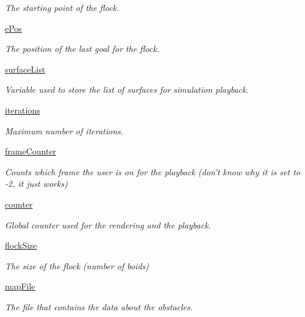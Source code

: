 \begin{DoxyCompactItemize}
\begin{DoxyCompactList}\small\item\em The starting point of the flock. \end{DoxyCompactList}\item 
\hyperlink{classboidsimulation_1_1FlockSim_acb064f74364917a97ca9d3accdf96f45}{e\-Pos}
\begin{DoxyCompactList}\small\item\em The position of the last goal for the flock. \end{DoxyCompactList}\item 
\hyperlink{classboidsimulation_1_1FlockSim_a60f47dc6f8186030cd22f3ca3b37c4e6}{surface\-List}
\begin{DoxyCompactList}\small\item\em Variable used to store the list of surfaces for simulation playback. \end{DoxyCompactList}\item 
\hyperlink{classboidsimulation_1_1FlockSim_a1febd4cacbdcffb5b9d096d4716af78f}{iterations}
\begin{DoxyCompactList}\small\item\em Maximum number of iterations. \end{DoxyCompactList}\item 
\hyperlink{classboidsimulation_1_1FlockSim_a7daba8b4e771dcd6f6a7357bda59c56a}{frame\-Counter}
\begin{DoxyCompactList}\small\item\em Counts which frame the user is on for the playback (don't know why it is set to -\/2, it just works) \end{DoxyCompactList}\item 
\hyperlink{classboidsimulation_1_1FlockSim_af378fd310919691dec50f5d312931726}{counter}
\begin{DoxyCompactList}\small\item\em Global counter used for the rendering and the playback. \end{DoxyCompactList}\item 
\hyperlink{classboidsimulation_1_1FlockSim_a125fa6c2909527f18c768f09606ab442}{flock\-Size}
\begin{DoxyCompactList}\small\item\em The size of the flock (number of boids) \end{DoxyCompactList}\item 
\hyperlink{classboidsimulation_1_1FlockSim_a50b375f7caa0e33d87141d2cde14526f}{map\-File}
\begin{DoxyCompactList}\small\item\em The file that contains the data about the obstacles. \end{DoxyCompactList}\item 

\end{DoxyCompactItemize}
